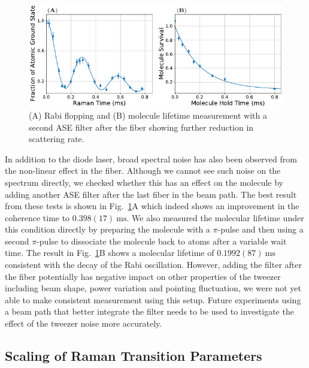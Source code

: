\begin{figure}
  \centering
  \includegraphics[width=\textwidth]{figures/raman_transfer_fit_two_ase.pdf}
  \caption[Signal improvement with a second ASE filter after the fiber.]{
    (A) Rabi flopping and (B) molecule lifetime measurement
    with a second ASE filter after the fiber showing further reduction in scattering rate.
    \label{fig:raman-transfer:results:ase:two}}
\end{figure}

In addition to the diode laser, broad spectral noise has also been observed
from the non-linear effect in the fiber.
Although we cannot see such noise on the spectrum directly,
we checked whether this has an effect on the molecule by adding another ASE filter after
the last fiber in the beam path.
The best result from these tests is shown in Fig.~\ref{fig:raman-transfer:results:ase:two}A
which indeed shows an improvement in the coherence time to $0.398(17)~\mathrm{ms}$.
We also measured the molecular lifetime under this condition directly
by preparing the molecule with a $\pi$-pulse
and then using a second $\pi$-pulse to dissociate the molecule back to atoms
after a variable wait time.
The result in Fig.~\ref{fig:raman-transfer:results:ase:two}B
shows a molecular lifetime of $0.1992(87)~\mathrm{ms}$
consistent with the decay of the Rabi oscillation.
However, adding the filter after the fiber potentially has negative impact
on other properties of the tweezer including beam shape,
power variation and pointing fluctuation,
we were not yet able to make consistent measurement using this setup.
Future experiments using a beam path that better integrate the filter
needs to be used to investigate the effect of the tweezer noise more accurately.

\subsection{Scaling of Raman Transition Parameters}
\label{ch:raman-transfer:results:scaling}

